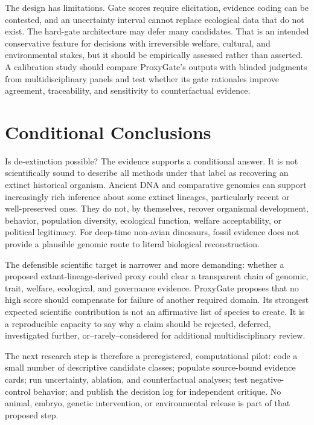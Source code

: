 \documentclass[conference]{IEEEtran}
\begin{document}
The design has limitations. Gate scores require elicitation, evidence coding can be contested, and an uncertainty interval cannot replace ecological data that do not exist. The hard-gate architecture may defer many candidates. That is an intended conservative feature for decisions with irreversible welfare, cultural, and environmental stakes, but it should be empirically assessed rather than asserted. A calibration study should compare ProxyGate's outputs with blinded judgments from multidisciplinary panels and test whether its gate rationales improve agreement, traceability, and sensitivity to counterfactual evidence.

\section{Conditional Conclusions}

Is de-extinction possible? The evidence supports a conditional answer. It is not scientifically sound to describe all methods under that label as recovering an extinct historical organism. Ancient DNA and comparative genomics can support increasingly rich inference about some extinct lineages, particularly recent or well-preserved ones. They do not, by themselves, recover organismal development, behavior, population diversity, ecological function, welfare acceptability, or political legitimacy. For deep-time non-avian dinosaurs, fossil evidence does not provide a plausible genomic route to literal biological reconstruction.

The defensible scientific target is narrower and more demanding: whether a proposed extant-lineage-derived proxy could clear a transparent chain of genomic, trait, welfare, ecological, and governance evidence. ProxyGate proposes that no high score should compensate for failure of another required domain. Its strongest expected scientific contribution is not an affirmative list of species to create. It is a reproducible capacity to say why a claim should be rejected, deferred, investigated further, or--rarely--considered for additional multidisciplinary review.

The next research step is therefore a preregistered, computational pilot: code a small number of descriptive candidate classes; populate source-bound evidence cards; run uncertainty, ablation, and counterfactual analyses; test negative-control behavior; and publish the decision log for independent critique. No animal, embryo, genetic intervention, or environmental release is part of that proposed step.
\end{document}
